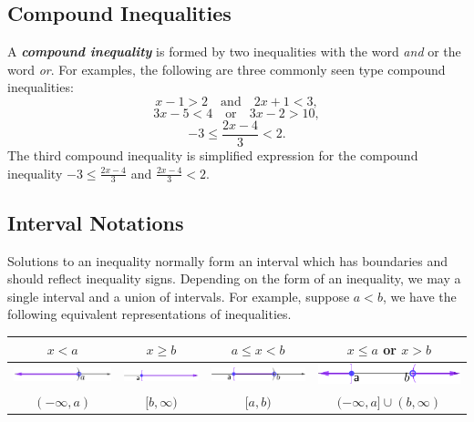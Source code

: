 \documentclass[en,12pt]{elegantbook}
\begin{document}
\hypertarget{compound-inequalities}{%
\subsection*{Compound Inequalities}\label{compound-inequalities}}

A \textbf{\emph{compound inequality}} is formed by two inequalities with the word \emph{and} or the word \emph{or}. For examples, the following are three commonly seen type compound inequalities:
\[
x-1>2\quad \text{and} \quad 2x+1<3,
\]
\[
3x-5<4\quad \text{or} \quad 3x-2>10,
\]
\[
-3\leq \frac{2x-4}{3}<2.
\]
The third compound inequality is simplified expression for the compound inequality \(-3\leq \frac{2x-4}{3}\) and \(\frac{2x-4}{3}<2\).

\hypertarget{interval-notations}{%
\subsection*{Interval Notations}\label{interval-notations}}

Solutions to an inequality normally form an interval which has boundaries and should reflect inequality signs. Depending on the form of an inequality, we may a single interval and a union of intervals. For example, suppose \(a<b\), we have the following equivalent representations of inequalities.

\begin{longtable}[]{@{}cccc@{}}
\toprule
\(x<a\) & \(x\ge b\) & \(a\le x<b\) & \(x\le a\) or \(x>b\)\tabularnewline
\midrule
\endhead
\includegraphics{figs/Interval-number-line-less-than.png} & \includegraphics{figs/Interval-number-line-greater-than.png} & \includegraphics{figs/Interval-number-line-between.png} & \includegraphics{figs/Interval-number-line-beyond.png}\tabularnewline
\((-\infty, a)\) & \([b,\infty)\) & \([a, b)\) & \((-\infty, a]\cup (b,\infty)\)\tabularnewline
\bottomrule
\end{longtable}
\end{document}
